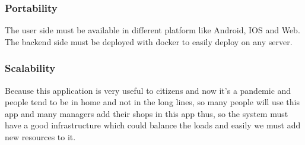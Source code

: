 \subsubsection{Portability}
The user side must be available in different platform like Android, IOS and Web. The backend side must be deployed with docker to easily deploy on any server.
\\

\subsubsection{Scalability}
Because this application is very useful to citizens and now it's a pandemic and people tend to be in home and not in the long lines, so many people will use this app and many managers add their shops in this app thus, so the system must have a good infrastructure which could balance the loads and easily we must add new resources to it.
\\